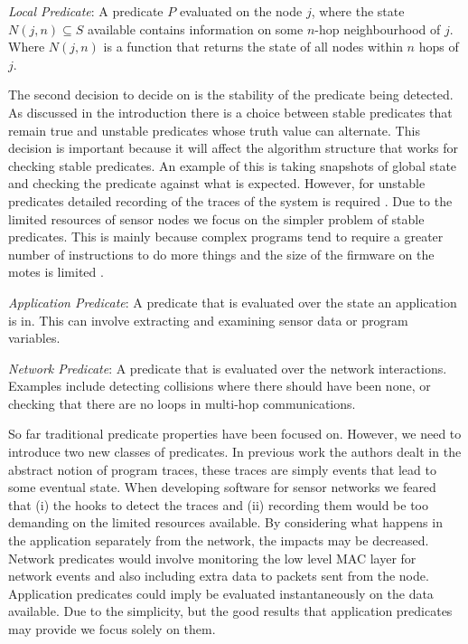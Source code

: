 \begin{mydef}
\emph{Local Predicate}: A predicate $P$ evaluated on the node $j$, where the state $N(j, n) \subseteq S$ available contains information on some $n$-hop neighbourhood of $j$. Where $N(j, n)$ is a function that returns the state of all nodes within $n$ hops of $j$.
\end{mydef}

The second decision to decide on is the stability of the predicate being detected. As discussed in the introduction there is a choice between stable predicates that remain true and unstable predicates whose truth value can alternate. This decision is important because it will affect the algorithm structure that works for checking stable predicates. An example of this is taking snapshots of global state and checking the predicate against what is expected. However, for unstable predicates detailed recording of the traces of the system is required \cite{bansod2004distributed}. Due to the limited resources of sensor nodes we focus on the simpler problem of stable predicates. This is mainly because complex programs tend to require a greater number of instructions to do more things and the size of the firmware on the motes is limited \cite{CM5000}.


\begin{mydef}
\emph{Application Predicate}: A predicate that is evaluated over the state an application is in. This can involve extracting and examining sensor data or program variables.
\end{mydef}

\begin{mydef}
\emph{Network Predicate}: A predicate that is evaluated over the network interactions. Examples include detecting collisions where there should have been none, or checking that there are no loops in multi-hop communications.
\end{mydef}

So far traditional predicate properties have been focused on. However, we need to introduce two new classes of predicates. In previous work the authors dealt in the abstract notion of program traces, these traces are simply events that lead to some eventual state. When developing software for sensor networks we feared that (i) the hooks to detect the traces and (ii) recording them would be too demanding on the limited resources available. By considering what happens in the application separately from the network, the impacts may be decreased. Network predicates would involve monitoring the low level MAC layer for network events and also including extra data to packets sent from the node. Application predicates could imply be evaluated instantaneously on the data available. Due to the simplicity, but the good results that application predicates may provide we focus solely on them.

